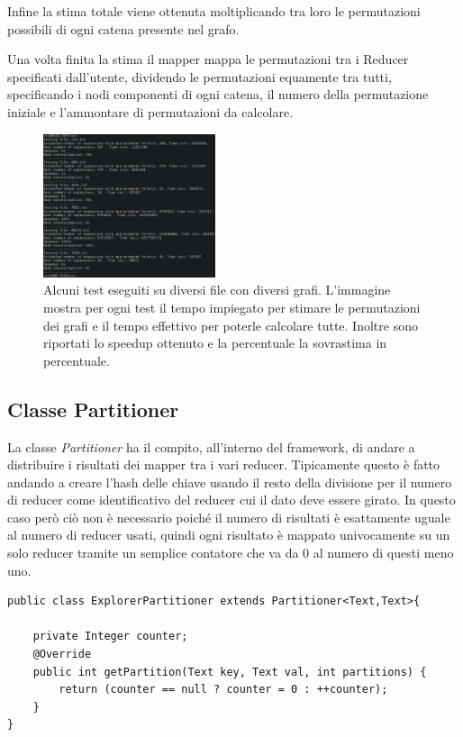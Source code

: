 \documentclass[]{IEEEtran}
\begin{document}
Infine la stima totale viene ottenuta moltiplicando tra loro le permutazioni possibili di ogni catena presente nel grafo.

Una volta finita la stima il mapper mappa le permutazioni tra i Reducer specificati dall'utente, dividendo le permutazioni equamente tra tutti, specificando i nodi componenti di ogni catena, il numero della permutazione iniziale e l'ammontare di permutazioni da calcolare.
\begin{figure}[htp]
	\centering
	\includegraphics[width=0.45\textwidth]{images/tests.png}
	\caption{Alcuni test eseguiti su diversi file con diversi grafi. L'immagine mostra per ogni test il tempo impiegato per stimare le permutazioni dei grafi e il tempo effettivo per poterle calcolare tutte. Inoltre sono riportati lo speedup ottenuto e la percentuale la sovrastima in percentuale.}
\end{figure}

\subsection{Classe Partitioner}
La classe \emph{Partitioner} ha il compito, all'interno del framework, di andare a distribuire i risultati dei mapper tra i vari reducer. Tipicamente questo è fatto andando a creare l'hash delle chiave usando il resto della divisione per il numero di reducer come identificativo del reducer cui il dato deve essere girato. In questo caso però ciò non è necessario poiché il numero di risultati è esattamente uguale al numero di reducer usati, quindi ogni risultato è mappato univocamente su un solo reducer tramite un semplice contatore che va da 0 al numero di questi meno uno.
\begin{lstlisting}[style=javaStyle]
public class ExplorerPartitioner extends Partitioner<Text,Text>{

	private Integer counter;
	@Override
	public int getPartition(Text key, Text val, int partitions) {
		return (counter == null ? counter = 0 : ++counter);
	}
}
\end{lstlisting}
\end{document}
